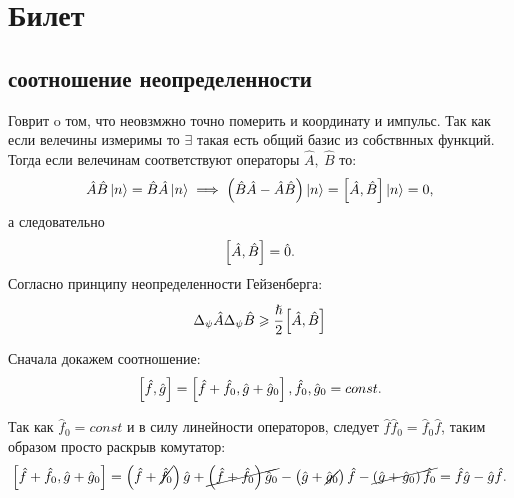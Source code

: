 \section{Билет}
\subsection{соотношение неопределенности}

Говрит o том, что неовзмжно точно померить и координату и импульс.
 Так как если велечины измеримы то $\exists$ такая есть общий базис 
 из собствнных функций. Тогда если велечинам соответствуют 
 операторы $\hat A,\ \hat B$ то:
\begin{equation*} 
 \hat A \hat B \ket{n} = \hat B \hat A  \ket{n} \implies 
 \left( \hat B \hat A - \hat A \hat B \right) \ket{n} = 
 \left[ \hat A, \hat B \right]\ket{n} = 0,
\end{equation*}
а следовательно 
\begin{equation} \label{eq:1.2}
 \left[ \hat A, \hat B \right] =\hat 0.
\end{equation} 
Согласно принципу неопределенности Гейзенберга:
\begin{equation} 
 \Delta_{\psi} \hat A \Delta_{\psi} \hat B \geqslant \cfrac{\hslash}{2}
 \left[ \hat A, \hat B \right]
\end{equation} 

Сначала докажем соотношение:
\begin{equation} 
  \left[ \hat f, \hat g \right] = \left[ \hat f + \hat f_0, \hat g +\hat 
  g_0 \right], \hat f_0, \hat g_0 = const.
\end{equation} 

\stp Так как $\hat f_0 = const$ и в силу линейности операторов, 
следует $\hat f \hat f_0 = \hat f_0 \hat f$, таким образом просто
раскрыв комутатор:
\begin{equation*} 
  \left[ \hat f + \hat f_0, \hat g + \hat g_0 \right] = 
  \left(  \hat f + \cancel{\hat f_0} \right) \hat g 
  + \cancel{\left( \hat f + \hat f_0 \right) \hat g_0}
  - \left( \hat g + \cancel{\hat g_0} \right)\hat f 
  - \cancel{\left( \hat g + \hat g_0 \right)\hat f_0} =
  \hat f \hat g - \hat g \hat f.
\end{equation*} 
\enp

